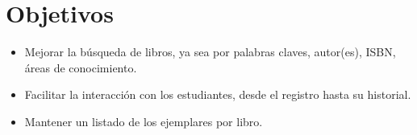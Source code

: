 \section{Objetivos}
\begin{itemize}
  \item Mejorar la búsqueda de libros, ya sea por palabras claves, autor(es), ISBN, áreas de conocimiento.
  \item Facilitar la interacción con los estudiantes, desde el registro hasta su historial.
  \item Mantener un listado de los ejemplares por libro.
\end{itemize}